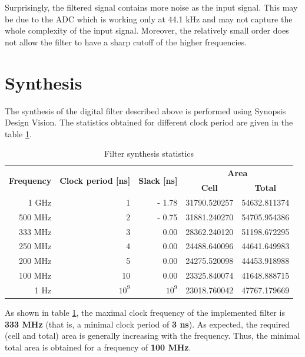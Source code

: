 Surprisingly, the filtered signal contains more noise as the input signal. This may be due to the ADC which is working only at 44.1 kHz and may not capture the whole complexity of the input signal. Moreover, the relatively small order does not allow the filter to have a sharp cutoff of the higher frequencies.


\section{Synthesis}

The synthesis of the digital filter described above is performed using Synopsis Design Vision. The statistics obtained for different clock period are given in the table \ref{table:synthesisStats}.

\begin{table}[!h]
	\centering
	\begin{tabular}{|r|r|r|r|r|}
		\hline
		 \multirow{2}{*}{\textbf{Frequency}}
		 & \multirow{2}{*}{\textbf{Clock period [ns]}}
		 & \multirow{2}{*}{\textbf{Slack [ns]}} & \multicolumn{2}{c|}{\textbf{Area}} \\
		 \cline{4-5}
		 & & & \multicolumn{1}{c|}{\textbf{Cell}} & \multicolumn{1}{c|}{\textbf{Total}} \\
		\hline
		 1 GHz & 1 & - 1.78 & 31790.520257 & 54632.811374 \\
		 500 MHz & 2 & - 0.75 & 31881.240270 & 54705.954386 \\
		 \rowcolor{Blue}
		 333 MHz & 3 & 0.00 & 28362.240120 & 51198.672295 \\
		 250 MHz & 4 & 0.00 & 24488.640096 & 44641.649983 \\
		 200 MHz & 5 & 0.00 & 24275.520098 & 44453.918988 \\
		 \rowcolor{Green}
		 100 MHz & 10 & 0.00 & 23325.840074 & 41648.888715 \\
		 1 Hz & $10^{9}$ & ~$10^{9}$ & 23018.760042 & 47767.179669 \\
		\hline
	\end{tabular}
	\label{table:synthesisStats}
	\caption{Filter synthesis statistics}
\end{table} 

As shown in table \ref{table:synthesisStats}, the maximal clock frequency of the implemented filter is \textbf{333 MHz} (that is, a minimal clock period of \textbf{3 ns}). As expected, the required (cell and total) area is generally increasing with the frequency. Thus, the minimal total area is obtained for a frequency of \textbf{100 MHz}.
